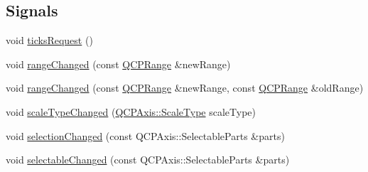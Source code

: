 \subsection*{Signals}
\begin{DoxyCompactItemize}
\item 
void \mbox{\hyperlink{class_q_c_p_axis_af46d99613d29518795134ec4928e3873}{ticks\+Request}} ()
\item 
void \mbox{\hyperlink{class_q_c_p_axis_a0894084e4c16a1736534c4095746f910}{range\+Changed}} (const \mbox{\hyperlink{class_q_c_p_range}{Q\+C\+P\+Range}} \&new\+Range)
\item 
void \mbox{\hyperlink{class_q_c_p_axis_aac8576288e8e31f16186124bc10dd10d}{range\+Changed}} (const \mbox{\hyperlink{class_q_c_p_range}{Q\+C\+P\+Range}} \&new\+Range, const \mbox{\hyperlink{class_q_c_p_range}{Q\+C\+P\+Range}} \&old\+Range)
\item 
void \mbox{\hyperlink{class_q_c_p_axis_a3505ed8a93bd2e349d858d84996bf767}{scale\+Type\+Changed}} (\mbox{\hyperlink{class_q_c_p_axis_a36d8e8658dbaa179bf2aeb973db2d6f0}{Q\+C\+P\+Axis\+::\+Scale\+Type}} scale\+Type)
\item 
void \mbox{\hyperlink{class_q_c_p_axis_a62b598abeee7174a05f9d542cc85b1f5}{selection\+Changed}} (const Q\+C\+P\+Axis\+::\+Selectable\+Parts \&parts)
\item 
void \mbox{\hyperlink{class_q_c_p_axis_aa5ff1fd851139028a3bb4efcb31de9fc}{selectable\+Changed}} (const Q\+C\+P\+Axis\+::\+Selectable\+Parts \&parts)
\end{DoxyCompactItemize}

